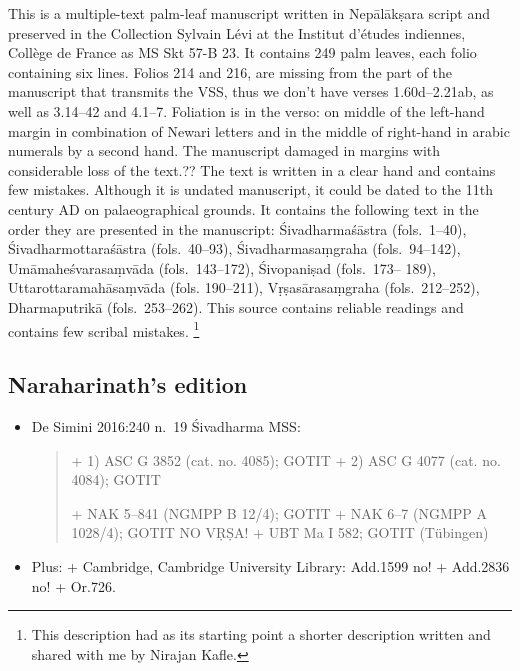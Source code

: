 \documentclass[11pt]{book}
\begin{document}
This is a multiple-text palm-leaf manuscript written in 
Nepālākṣara script and preserved in the 
Collection Sylvain Lévi at the Institut d'études
indiennes, Collège de France as MS Skt 57-B 23. 
It contains 249 palm leaves, each folio containing six lines. 
Folios 214 and 216, are missing from the 
part of the manuscript that transmits the VSS,
thus we don't have verses 1.60d--2.21ab, as well as
3.14--42 and 4.1--7.
Foliation is in the verso: on middle of the left-hand margin in
combination of Newari letters and in the middle of right-hand in arabic
numerals by a second hand. 
The manuscript damaged in margins with considerable loss of the text.?? The text is written in a clear hand and contains few mistakes. Although it is undated manuscript, it could be dated to the 11th century AD on palaeographical grounds. It contains the following text in the order they are presented in the manuscript:
Śivadharmaśāstra (fols.~1--40), 
Śivadharmottaraśāstra (fols.~40--93), 
Śivadharmasaṃgraha (fols.~94--142), 
Umāmaheśvarasaṃvāda (fols.~143--172), 
Śivopaniṣad (fols.~173-- 189), 
Uttarottaramahāsaṃvāda (fols. 190--211), 
Vṛṣasārasaṃgraha (fols.~212--252), 
Dharmaputrikā (fols.~253--262). 
This source contains reliable readings and contains
few scribal mistakes.%
	\footnote{This description had as its starting point a
			          shorter description written and 
			          shared with me by Nirajan Kafle.}


\subsection{Naraharinath's edition}

\begin{itemize}
\item
  De Simini 2016:240 n.~19 Śivadharma MSS:

\begin{quote}
  + 1) ASC G 3852 (cat. no. 4085); GOTIT 
  + 2) ASC G 4077 (cat. no. 4084); GOTIT

  + NAK 5--841 (NGMPP B 12/4); GOTIT 
  + NAK 6--7 (NGMPP A 1028/4);  GOTIT NO VṚṢA! 
  + UBT Ma I 582; GOTIT (Tübingen)
\end{quote}
\item
  Plus: + Cambridge, Cambridge University Library: Add.1599 no! +
  Add.2836 no! + Or.726.
\end{itemize}
\end{document}
